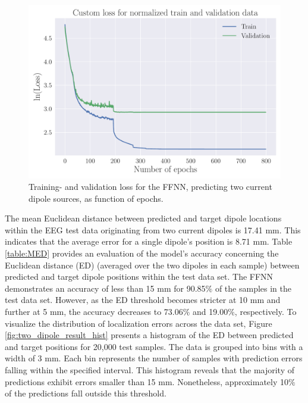 \documentclass[a4paper, UKenglish, 11pt]{uiomaster}
\begin{document}
\begin{figure}[!htb]
    \centering
    \includegraphics[width=\linewidth]{figures/NN_two_dipole/Custom_Loss_simple_last_run_old_std_2_dipoles_32_0.001_0.35_0.1_0_800_(0).pdf}
    \caption{Training- and validation loss for the FFNN, predicting two current dipole sources, as function of epochs.}
    \label{fig:two_dipole_result_FFNN}
\end{figure}

\FloatBarrier

The mean Euclidean distance between predicted and target dipole locations within the EEG test data originating from two current dipoles is 17.41 mm. This indicates that the average error for a single dipole's position is 8.71 mm. Table \ref{table:MED} provides an evaluation of the model's accuracy concerning the Euclidean distance (ED) (averaged over the two dipoles in each sample) between predicted and target dipole positions within the test data set. The FFNN demonstrates an accuracy of less than 15 mm for 90.85$\%$ of the samples in the test data set. However, as the ED threshold becomes stricter at 10 mm and further at 5 mm, the accuracy decreases to 73.06$\%$ and 19.00$\%$, respectively. To visualize the distribution of localization errors across the data set, Figure \ref{fig:two_dipole_result_hist} presents a histogram of the ED between predicted and target positions for 20,000 test samples. The data is grouped into bins with a width of 3 mm. Each bin represents the number of samples with prediction errors falling within the specified interval. This histogram reveals that the majority of predictions exhibit errors smaller than 15 mm. Nonetheless, approximately 10$\%$ of the predictions fall outside this threshold.
\end{document}
